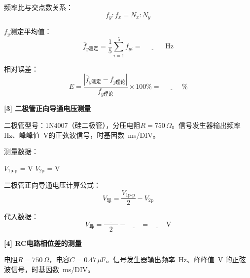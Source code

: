 \documentclass[a4paper,12pt]{article}
\begin{document}
{\vspace{0.3cm}

频率比与交点数关系：
\begin{equation}
    f_y : f_x = N_x : N_y
\end{equation}

$f_y$测定平均值：
\[
\bar{f}_{y\text{测定}} = \frac{1}{5}\sum_{i=1}^{5} f_{yi} = \underline{\quad\quad\quad} \text{ Hz}
\]

相对误差：
\[
E = \frac{|\bar{f}_{y\text{测定}} - f_{y\text{理论}}|}{f_{y\text{理论}}} \times 100\% = \underline{\quad\quad\quad}\%
\]

\vspace{0.5cm}

\textbf{[3] 二极管正向导通电压测量}

\vspace{0.2cm}

二极管型号：1N4007（硅二极管），分压电阻$R = 750$\,$\Omega$。信号发生器输出频率 \underline{\quad\quad}\,Hz、峰峰值 \underline{\quad\quad}\,V的正弦波信号，时基因数 \underline{\quad\quad}\,ms/DIV。

\vspace{0.2cm}

测量数据：

$V_{1\text{p-p}}$ = \underline{\quad\quad} V \qquad $V_{2\text{p}}$ = \underline{\quad\quad} V

\vspace{0.2cm}

二极管正向导通电压计算公式：
\begin{equation}
    V_{\text{导}} = \frac{V_{1\text{p-p}}}{2} - V_{2\text{p}}
\end{equation}

代入数据：
\[
V_{\text{导}} = \frac{\underline{\quad\quad}}{2} - \underline{\quad\quad} = \underline{\quad\quad} \text{ V}
\]

\vspace{0.5cm}

\textbf{[4] RC电路相位差的测量}

\vspace{0.2cm}

电阻$R = 750$\,$\Omega$，电容$C = 0.47$\,$\mu$F。信号发生器输出频率 \underline{\quad\quad}\,Hz、峰峰值 \underline{\quad\quad}\,V 的正弦波信号，时基因数 \underline{\quad\quad}\,ms/DIV。

\vspace{0.2cm}

}
\end{document}
